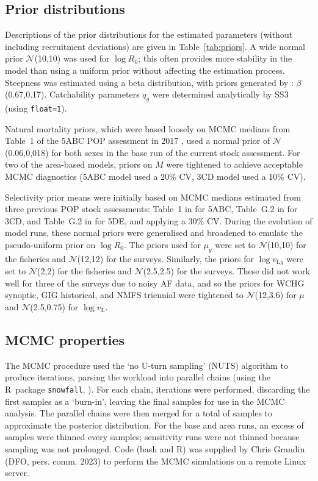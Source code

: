 \documentclass[11pt]{book}
\newcommand{\Norm}{\mathcal{N}}%
\newcommand{\pc}{\%}
\newcommand{\code}[1]{\normalsize\texttt{#1}\normalsize}%
\begin{document}
\subsection{Prior distributions}

Descriptions of the prior distributions for the estimated parameters (without including recruitment deviations) are given in Table~\ref{tab:priors}.
A wide normal prior $\Norm$(10,10) was used for $\log R_0$; this often provides more stability in the model than using a uniform prior without affecting the estimation process.
Steepness was estimated using a beta distribution, with priors generated by \citet{Forrest-etal:2010}: $\beta$(0.67,0.17).
Catchability parameters $q_g$ were determined analytically by SS3 (using \code{float=1}).

Natural mortality priors, which were based loosely on MCMC medians from Table~1 of the 5ABC POP assessment in 2017 \citep{Haigh-etal:2018_pop5ABC}, used a normal prior of $\Norm$(0.06,0,018) for both sexes in the base run of the current stock assessment.
For two of the area-based models, priors on $M$ were tightened to achieve acceptable MCMC diagnostics (5ABC model used a 20\pc{} CV, 3CD model used a 10\pc{} CV).

Selectivity prior means were initially based on MCMC medians estimated from three previous POP stock assessments: Table~1 in \citet{Haigh-etal:2018_pop5ABC} for 5ABC, Table~G.2 in \citet{Edwards-etal:2014_pop3CD} for 3CD, and Table~G.2 in \citet{Edwards-etal:2014_pop5DE} for 5DE, and applying a 30\pc{} CV.
During the evolution of model runs, these normal priors were generalised and broadened to emulate the pseudo-uniform prior on $\log R_0$.
The priors used for $\mu_g$ were set to $\Norm$(10,10) for the fisheries and $\Norm$(12,12) for the surveys.
Similarly, the priors for $\log v_{\text{L}g}$ were set to $\Norm$(2,2) for the fisheries and $\Norm$(2.5,2.5) for the surveys.
These did not work well for three of the surveys due to noisy AF data, and so the priors for WCHG synoptic, GIG historical, and NMFS triennial were tightened to $\Norm$(12,3.6) for $\mu$ and $\Norm$(2.5,0.75) for $\log v_\text{L}$.

\subsection{MCMC properties}

The MCMC procedure used the `no U-turn sampling' (NUTS) algorithm \citep{Monnahan-Kristensen:2018, Monnahan-etal:2019} to produce \nSims{} iterations, parsing the workload into \nChains{} parallel chains (using the R~package \code{snowfall}, \citealt{R:2015_snowfall}).
For each chain, \cSims{} iterations were performed, discarding the first \cBurn{} samples as a `burn-in', leaving the final \cSamps{} samples for use in the MCMC analysis.
The parallel chains were then merged for a total of \Nmcmc{} samples to approximate the posterior distribution.
For the base and area runs, an excess of samples were thinned every \nThin{} samples; sensitivity runs were not thinned because sampling was not prolonged.
Code (bash and R) was supplied by Chris Grandin (DFO, pers. comm. 2023) to perform the MCMC simulations on a remote Linux server.
\end{document}
